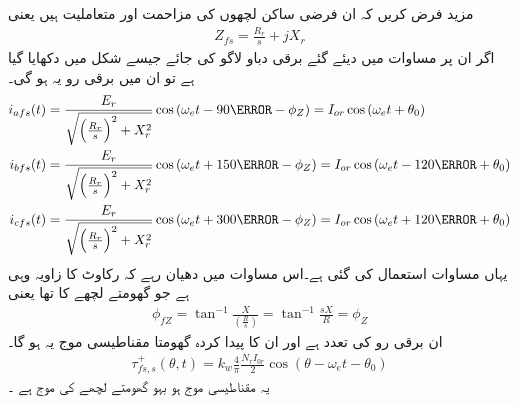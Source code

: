 مزید فرض کریں کہ ان فرضی ساکن لچھوں کی مزاحمت   اور متعاملیت   ہیں  یعنی
\begin{align}
Z_{fs}=\frac{R_r}{s}+j X_r
\end{align}
اگر ان پر مساوات   میں دیئے گئے برقی دباو لاگو کی جائے جیسے شکل   میں دکھایا گیا ہے تو ان میں برقی رو یہ ہو گی۔
\begin{gather}
\begin{aligned}
i_{afs}(t)&=\frac{E_r}{\sqrt{\left(\frac{R_r}{s} \right)^2+X_r^2}} \cos \left(\omega_e t-90\degree -\phi_Z  \right)=I_{or} \cos \left(\omega_e t+\theta_0 \right)\\
i_{bfs}(t)&=\frac{E_r}{\sqrt{\left(\frac{R_r}{s} \right)^2+X_r^2}} \cos \left(\omega_e t+150\degree -\phi_Z  \right)=I_{or}\cos \left(\omega_e t-120\degree +\theta_0 \right)\\
i_{cfs}(t)&=\frac{E_r}{\sqrt{\left(\frac{R_r}{s} \right)^2+X_r^2}} \cos \left(\omega_e t+300\degree -\phi_Z  \right)=I_{or} \cos \left(\omega_e t+120\degree+\theta_0 \right)
\end{aligned}
\end{gather}
یہاں مساوات   استعمال کی گئی ہے۔اس مساوات میں دھیان رہے کہ رکاوٹ کا زاویہ   وہی ہے جو گھومتے لچھے کا تھا یعنی
\begin{align}
\phi_{fZ}=\tan^{-1} \frac{X}{\left(\frac{R}{s} \right)}=\tan^{-1} \frac{s X}{R}=\phi_Z
\end{align}
ان برقی رو کی تعدد  ہے اور ان کا پیدا کردہ گھومتا مقناطیسی موج یہ ہو گا۔
\begin{align}
\tau_{fs,s}^+(\theta,t)=k_w \frac{4}{\pi}\frac{N_r I_{0r}}{2} \cos (\theta-\omega_e t-\theta_0)
\end{align}
یہ مقناطیسی موج ہو بہو گھومتے لچھے کی موج  ہے ۔


